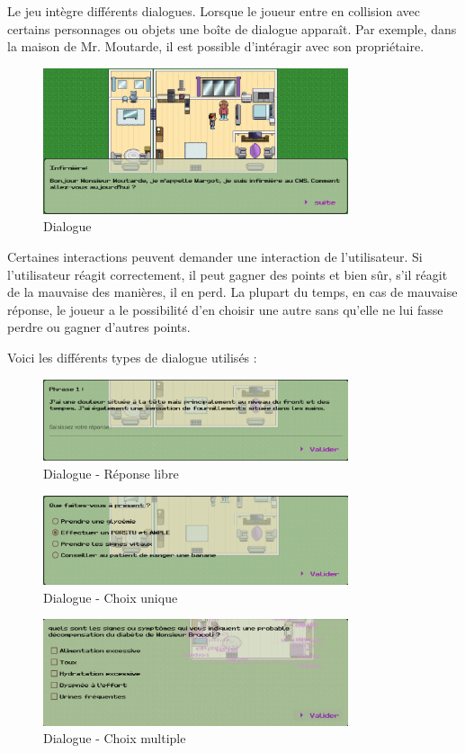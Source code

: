 Le jeu intègre différents dialogues. Lorsque le joueur entre en collision avec certains personnages ou objets une boîte de dialogue apparaît. Par exemple, dans la maison de Mr. Moutarde, il est possible d'intéragir avec son propriétaire.
\begin{figure}[H]
    \centering
    \includegraphics[width=0.8\textwidth ]{images/dialogs/dialog.png}
    \caption{Dialogue}
    \label{fig:pic_dessus}
\end{figure}

Certaines interactions peuvent demander une interaction de l'utilisateur. Si l'utilisateur réagit correctement, il peut gagner des points et bien sûr, s'il réagit de la mauvaise des manières, il en perd. La plupart du temps, en cas de mauvaise réponse, le joueur a le possibilité d'en choisir une autre sans qu'elle ne lui fasse perdre ou gagner d'autres points.

Voici les différents types de dialogue utilisés :
\begin{figure}[H]
    \centering
    \includegraphics[width=0.8\textwidth ]{images/dialogs/dialogInput.png}
    \caption{Dialogue - Réponse libre}
    \label{fig:pic_dessus}
\end{figure}

\begin{figure}[H]
    \centering
    \includegraphics[width=0.8\textwidth ]{images/dialogs/dialogRadioButton.png}
    \caption{Dialogue - Choix unique}
    \label{fig:pic_dessus}
\end{figure}

\begin{figure}[H]
    \centering
    \includegraphics[width=0.8\textwidth ]{images/dialogs/dialogCheckbox.png}
    \caption{Dialogue - Choix multiple}
    \label{fig:pic_dessus}
\end{figure}
